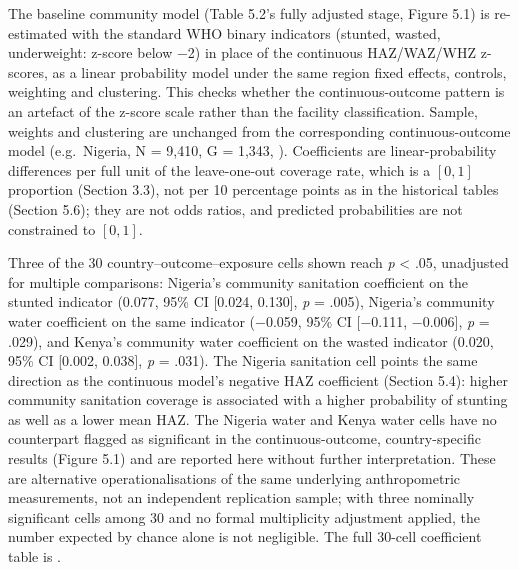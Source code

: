 The baseline community model (Table 5.2's fully adjusted stage, Figure 5.1) is re-estimated with the standard WHO binary indicators (stunted, wasted, underweight: z-score below −2) in place of the continuous HAZ/WAZ/WHZ z-scores, as a linear probability model under the same region fixed effects, controls, weighting and clustering. This checks whether the continuous-outcome pattern is an artefact of the z-score scale rather than the facility classification. Sample, weights and clustering are unchanged from the corresponding continuous-outcome model (e.g.~Nigeria, N = 9,410, G = 1,343, ). Coefficients are linear-probability differences per full unit of the leave-one-out coverage rate, which is a \([0,1]\) proportion (Section 3.3), not per 10 percentage points as in the historical tables (Section 5.6); they are not odds ratios, and predicted probabilities are not constrained to \([0,1]\).

Three of the 30 country--outcome--exposure cells shown reach \emph{p} \textless{} .05, unadjusted for multiple comparisons: Nigeria's community sanitation coefficient on the stunted indicator (0.077, 95\% CI {[}0.024, 0.130{]}, \emph{p} = .005), Nigeria's community water coefficient on the same indicator (−0.059, 95\% CI {[}−0.111, −0.006{]}, \emph{p} = .029), and Kenya's community water coefficient on the wasted indicator (0.020, 95\% CI {[}0.002, 0.038{]}, \emph{p} = .031). The Nigeria sanitation cell points the same direction as the continuous model's negative HAZ coefficient (Section 5.4): higher community sanitation coverage is associated with a higher probability of stunting as well as a lower mean HAZ. The Nigeria water and Kenya water cells have no counterpart flagged as significant in the continuous-outcome, country-specific results (Figure 5.1) and are reported here without further interpretation. These are alternative operationalisations of the same underlying anthropometric measurements, not an independent replication sample; with three nominally significant cells among 30 and no formal multiplicity adjustment applied, the number expected by chance alone is not negligible. The full 30-cell coefficient table is .
